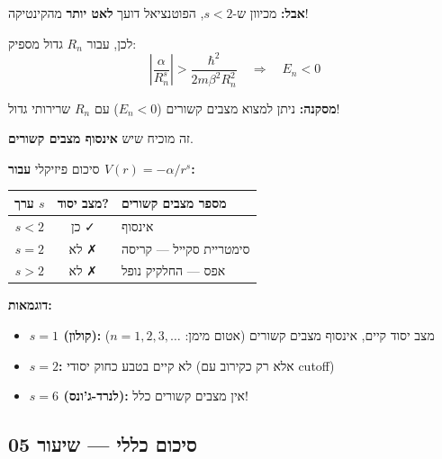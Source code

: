 \textbf{אבל:} מכיוון ש-$s < 2$, הפוטנציאל דועך \textbf{לאט יותר} מהקינטיקה!

לכן, עבור $R_n$ גדול מספיק:
\[
\left|\frac{\alpha}{R_n^s}\right| > \frac{\hbar^2}{2m\beta^2 R_n^2} \quad \Rightarrow \quad E_n < 0
\]

\textbf{מסקנה:} ניתן למצוא מצבים קשורים ($E_n < 0$) עם $R_n$ שרירותי גדול!

זה מוכיח שיש \textbf{אינסוף מצבים קשורים}.


\begin{importantbox}{סיכום פיזיקלי}
\textbf{עבור $V(r) = -\alpha/r^s$:}

\begin{center}
\begin{tabular}{|c|c|l|}
\hline
\textbf{ערך $s$} & \textbf{מצב יסוד?} & \textbf{מספר מצבים קשורים} \\
\hline
$s < 2$ & כן ✓ & אינסוף \\
\hline
$s = 2$ & לא ✗ & סימטריית סקייל — קריסה \\
\hline
$s > 2$ & לא ✗ & אפס — החלקיק נופל \\
\hline
\end{tabular}
\end{center}

\textbf{דוגמאות:}
\begin{itemize}
    \item \textbf{$s = 1$ (קולון):} מצב יסוד קיים, אינסוף מצבים קשורים (אטום מימן: $n = 1, 2, 3, \ldots$)
    \item \textbf{$s = 2$:} לא קיים בטבע כחוק יסודי (אלא רק כקירוב עם cutoff)
    \item \textbf{$s = 6$ (לנרד-ג'ונס):} אין מצבים קשורים כלל!
\end{itemize}
\end{importantbox}

\subsection{סיכום כללי — שיעור 05}

